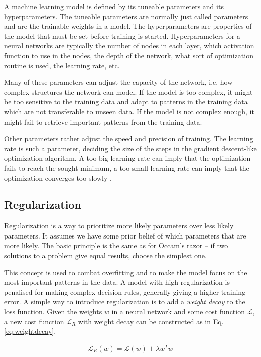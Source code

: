 A machine learning model is defined by its tuneable parameters and its hyperparameters. The tuneable parameters are normally just called parameters and are the trainable weights in a model. The hyperparameters are properties of the model that must be set before training is started. Hyperparameters for a neural networks are typically the number of nodes in each layer, which activation function to use in the nodes, the depth of the network, what sort of optimization routine is used, the learning rate, etc. 

Many of these parameters can adjust the capacity of the network, i.e. how complex structures the network can model. If the model is too complex, it might be too sensitive to the training data and adapt to patterns in the training data which are not transferable to unseen data. If the model is not complex enough, it might fail to retrieve important patterns from the training data.

Other parameters rather adjust the speed and precision of training. The learning rate is such a parameter, deciding the size of the steps in the gradient descent-like optimization algorithm. A too big learning rate can imply that the optimization fails to  reach the sought minimum, a too small learning rate can imply that the optimization converges too slowly \citep{Goodfellow-et-al-2016}. 

\subsection{Regularization}\label{sec:regul}

Regularization is a way to prioritize more likely parameters over less likely parameters. It assumes we have some prior belief of which parameters that are more likely. The basic principle is the same as for Occam's razor -- if two solutions to a problem give equal results, choose the simplest one.

This concept is used to combat overfitting and to make the model focus on the most important patterns in the data. A model with high regularization is penalised for making complex decision rules, generally giving a higher training error. A simple way to introduce regularization is to add a \emph{weight decay} to the loss function. Given the weights $w$ in a neural network and some cost function $\mathcal{L}$, a new cost function $\mathcal{L}_R$ with weight decay can be constructed as in Eq. \ref{eq:weightdecay}.

\begin{align}
    \mathcal{L}_R (w) = \mathcal{L}(w) + \lambda w^T w
    \label{eq:weightdecay}
\end{align}


